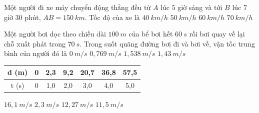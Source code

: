\begin{vidu}%
Một người đi xe máy chuyển động thẳng đều từ $A$ lúc $5$ giờ sáng và tới $B$ lúc $7$ giờ $30$ phút, $AB = 150\ km$. Tốc độ của xe là
\choice
{$40\ km/h$}
{$50\ km/h$}
{\True $60\ km/h$}
{$70\ km/h$}
\end{vidu}

\begin{vidu}
Một người bơi dọc theo chiều dài $100\ m$ của bể bơi hết $60\ s$ rồi bơi quay về lại chỗ xuất phát trong $70\ s$. Trong suốt quãng đường bơi đi và bơi về, vận tốc trung bình của người đó là
\choice
{\True $0\ m/s$}
{$0,769\ m/s$}
{$1,538\ m/s$}
{$1,43\ m/s$}
\loigiai{
}
\end{vidu}

\begin{vidu}
{\begin{tabular}{|c|c|c|c|c|c|c|}
\hline 
d (m)&0  &2,3  &9,2  &20,7  &36,8  &57,5  \\ 
\hline 
t (s)&0  &1,0  &2,0  &3,0  &4,0  &5,0  \\ 
\hline 
\end{tabular}} 
\choice
{\True $16,1\ m/s$}
{$2,3\ m/s$}
{$12,27\ m/s$}
{$11,5\ m/s$}
\end{vidu}




